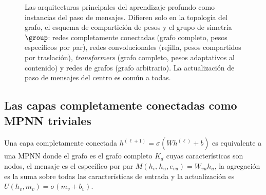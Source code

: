 \begin{figure}[h]
\caption[Arquitecturas como paso de mensajes]{Las arquitecturas principales del
aprendizaje profundo como instancias del paso de mensajes. Difieren solo en la
topolog\'ia del grafo, el esquema de compartici\'on de pesos y el grupo de
simetr\'ia $\group$: redes completamente conectadas (grafo completo, pesos
espec\'ificos por par), redes convolucionales (rejilla, pesos compartidos por
traslaci\'on), \emph{transformers} (grafo completo, pesos adaptativos al
contenido) y redes de grafos (grafo arbitrario). La actualizaci\'on de paso de
mensajes del centro es com\'un a todas.}
\label{fig:priors:mpnn}
\end{figure}

\subsection{Las capas completamente conectadas como MPNN triviales}
\label{subsec:priors:ann-mpnn}

\begin{proposition}
\label{prop:priors:ann-mpnn}
Una capa completamente conectada $h^{(\ell+1)} = \sigma(W h^{(\ell)} + b)$ es
equivalente a una MPNN donde el grafo es el grafo completo $K_d$ cuyas
caracter\'isticas son nodos, el mensaje es el espec\'ifico por par
$M(h_v, h_u, e_{vu}) = W_{vu} h_u$, la agregaci\'on es la suma sobre todas las
caracter\'isticas de entrada y la actualizaci\'on es
$U(h_v, m_v) = \sigma(m_v + b_v)$.
\end{proposition}

